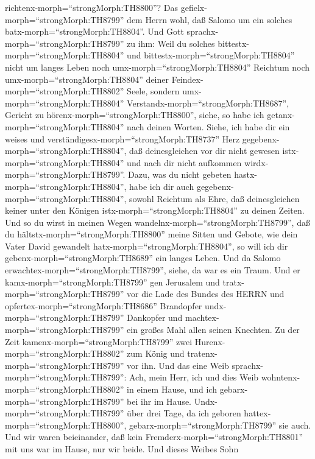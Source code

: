 richtenx-morph=``strongMorph:TH8800''?  Das
gefielx-morph=``strongMorph:TH8799'' dem Herrn wohl, daß Salomo um ein
solches batx-morph=``strongMorph:TH8804''.  Und Gott
sprachx-morph=``strongMorph:TH8799'' zu ihm: Weil du solches
bittestx-morph=``strongMorph:TH8804'' und
bittestx-morph=``strongMorph:TH8804'' nicht um langes Leben noch
umx-morph=``strongMorph:TH8804'' Reichtum noch
umx-morph=``strongMorph:TH8804'' deiner
Feindex-morph=``strongMorph:TH8802'' Seele, sondern
umx-morph=``strongMorph:TH8804'' Verstandx-morph=``strongMorph:TH8687'',
Gericht zu hörenx-morph=``strongMorph:TH8800'',  siehe, so
habe ich getanx-morph=``strongMorph:TH8804'' nach deinen Worten. Siehe,
ich habe dir ein weises und verständigesx-morph=``strongMorph:TH8737''
Herz gegebenx-morph=``strongMorph:TH8804'', daß deinesgleichen vor dir
nicht gewesen istx-morph=``strongMorph:TH8804'' und nach dir nicht
aufkommen wirdx-morph=``strongMorph:TH8799''.  Dazu, was du
nicht gebeten hastx-morph=``strongMorph:TH8804'', habe ich dir auch
gegebenx-morph=``strongMorph:TH8804'', sowohl Reichtum als Ehre, daß
deinesgleichen keiner unter den Königen
istx-morph=``strongMorph:TH8804'' zu deinen Zeiten.  Und so
du wirst in meinen Wegen wandelnx-morph=``strongMorph:TH8799'', daß du
hältstx-morph=``strongMorph:TH8800'' meine Sitten und Gebote, wie dein
Vater David gewandelt hatx-morph=``strongMorph:TH8804'', so will ich dir
gebenx-morph=``strongMorph:TH8689'' ein langes Leben.  Und
da Salomo erwachtex-morph=``strongMorph:TH8799'', siehe, da war es ein
Traum. Und er kamx-morph=``strongMorph:TH8799'' gen Jerusalem und
tratx-morph=``strongMorph:TH8799'' vor die Lade des Bundes des HERRN und
opfertex-morph=``strongMorph:TH8686'' Brandopfer
undx-morph=``strongMorph:TH8799'' Dankopfer und
machtex-morph=``strongMorph:TH8799'' ein großes Mahl allen seinen
Knechten.  Zu der Zeit kamenx-morph=``strongMorph:TH8799''
zwei Hurenx-morph=``strongMorph:TH8802'' zum König und
tratenx-morph=``strongMorph:TH8799'' vor ihn.  Und das eine
Weib sprachx-morph=``strongMorph:TH8799'': Ach, mein Herr, ich und dies
Weib wohntenx-morph=``strongMorph:TH8802'' in einem Hause, und ich
gebarx-morph=``strongMorph:TH8799'' bei ihr im Hause. 
Undx-morph=``strongMorph:TH8799'' über drei Tage, da ich geboren
hattex-morph=``strongMorph:TH8800'', gebarx-morph=``strongMorph:TH8799''
sie auch. Und wir waren beieinander, daß kein
Fremderx-morph=``strongMorph:TH8801'' mit uns war im Hause, nur wir
beide.  Und dieses Weibes Sohn
